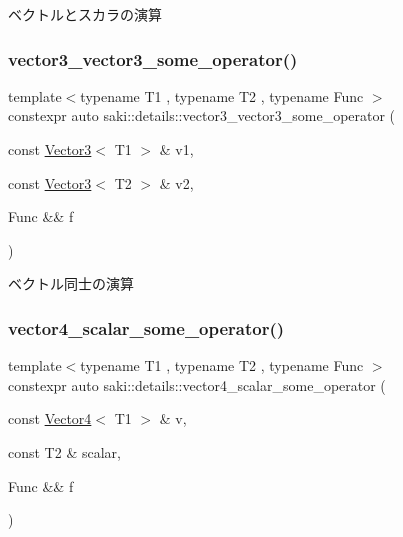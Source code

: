 ベクトルとスカラの演算 

\mbox{\label{namespacesaki_1_1details_a9d9fd5673ab6516752ecf05845e7f9b9}} 
\subsubsection{\texorpdfstring{vector3\+\_\+vector3\+\_\+some\+\_\+operator()}{vector3\_vector3\_some\_operator()}}
{\footnotesize\ttfamily template$<$typename T1 , typename T2 , typename Func $>$ \\
constexpr auto saki\+::details\+::vector3\+\_\+vector3\+\_\+some\+\_\+operator (\begin{DoxyParamCaption}\item[{const \mbox{\hyperlink{classsaki_1_1_vector3}{Vector3}}$<$ T1 $>$ \&}]{v1,  }\item[{const \mbox{\hyperlink{classsaki_1_1_vector3}{Vector3}}$<$ T2 $>$ \&}]{v2,  }\item[{Func \&\&}]{f }\end{DoxyParamCaption})}



ベクトル同士の演算 

\mbox{\label{namespacesaki_1_1details_a1786beb40b0c29d0e6ea19ce2aad110c}} 
\subsubsection{\texorpdfstring{vector4\+\_\+scalar\+\_\+some\+\_\+operator()}{vector4\_scalar\_some\_operator()}}
{\footnotesize\ttfamily template$<$typename T1 , typename T2 , typename Func $>$ \\
constexpr auto saki\+::details\+::vector4\+\_\+scalar\+\_\+some\+\_\+operator (\begin{DoxyParamCaption}\item[{const \mbox{\hyperlink{classsaki_1_1_vector4}{Vector4}}$<$ T1 $>$ \&}]{v,  }\item[{const T2 \&}]{scalar,  }\item[{Func \&\&}]{f }\end{DoxyParamCaption})}



